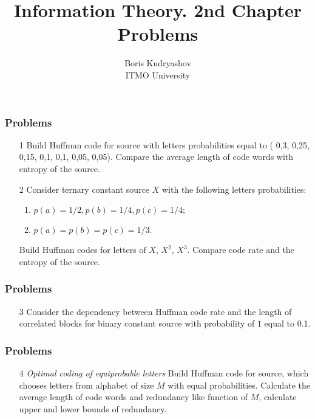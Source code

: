 \documentclass[14pt]{beamer}
\title{\small{Information Theory. 2nd Chapter Problems}}
\author{\huge{
Boris Kudryashov \\
\vspace{30pt}
ITMO University
}}
\begin{document}
\maketitle

\begin{frame}
\frametitle{Problems}
\begin{enumerate}
  \item[1] Build Huffman code for source with letters probabilities equal to ( 0,3, 0,25, 0,15, 0,1, 0,1, 0,05, 0,05). Compare the average length of code words with entropy of the source.
  \pause \item[2] Consider ternary constant source $X$  with the following letters probabilities: 
    \begin{enumerate}
    \item
    $p\left( a \right) = 1/2,p\left( b\right) = 1/4,p\left(c\right)=1/4;$
    \item
    $p\left( a \right) = p\left( b \right) = p\left( c \right) = 1 / 3.$
    \end{enumerate}
  Build Huffman codes for letters of $X$, $X^{2}$, $X^{3}$. Compare code rate and the entropy of the source.
\end{enumerate}
\end{frame}


\begin{frame}
\frametitle{Problems}
\begin{enumerate}

  \item[3] Consider the dependency between Huffman code rate and the length of correlated blocks for binary constant source with probability of $1$ equal to 0.1.
  
\end{enumerate}
\end{frame}


\begin{frame}
\frametitle{Problems}
\begin{enumerate}

  \item[4] \emph{Optimal coding of equiprobable letters} 
  Build Huffman code for source, which chooses letters from alphabet of size $M$ with equal probabilities. Calculate the average length of code words and redundancy like function of $M$, calculate upper and lower bounds of redundancy.
  
  \end{enumerate}
\end{frame}
\end{document}
